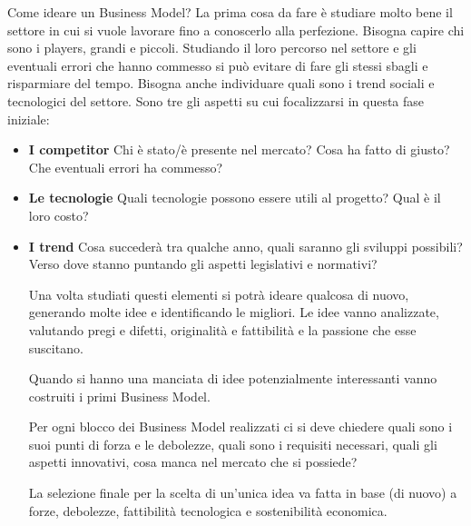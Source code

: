 Come ideare un Business Model? La prima cosa da fare è studiare molto bene il
settore in cui si vuole lavorare fino a conoscerlo alla perfezione.
Bisogna capire chi sono i players, grandi e piccoli. Studiando il loro
percorso nel settore e gli eventuali errori che hanno commesso si può
evitare di fare gli stessi sbagli e risparmiare del tempo. Bisogna anche
individuare quali sono i trend sociali e tecnologici del settore.
Sono tre gli aspetti su cui focalizzarsi in questa fase iniziale:

\begin{itemize}

\item \textbf{I competitor} Chi è stato/è presente nel mercato?
Cosa ha fatto di giusto? Che eventuali errori ha commesso?

\item \textbf{Le tecnologie} Quali tecnologie possono essere utili al progetto?
Qual è il loro costo?

\item \textbf{I trend} Cosa succederà tra qualche anno, quali saranno gli
sviluppi possibili? Verso dove stanno puntando gli aspetti legislativi e
normativi?

Una volta studiati questi elementi si potrà ideare qualcosa di nuovo,
generando molte idee e identificando le migliori.
Le idee vanno analizzate, valutando pregi e difetti, originalità e
fattibilità e la passione che esse suscitano.

Quando si hanno una manciata di idee potenzialmente interessanti vanno
costruiti i primi Business Model.

Per ogni blocco dei Business Model realizzati ci si deve chiedere quali
sono i suoi punti di forza e le debolezze, quali sono i requisiti
necessari, quali gli aspetti innovativi, cosa manca nel mercato che si
possiede?

La selezione finale per la scelta di un'unica idea va fatta in base
(di nuovo) a forze, debolezze, fattibilità tecnologica e sostenibilità
economica.

\end{itemize}
